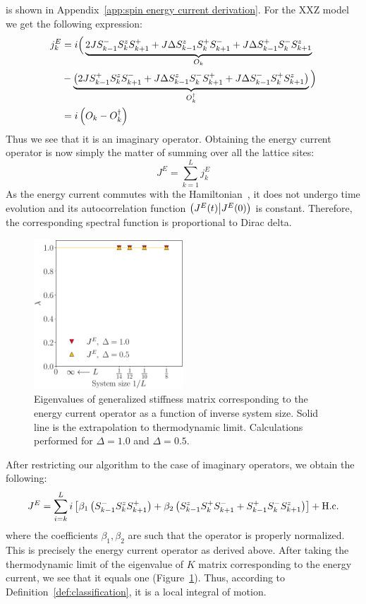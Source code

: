 is shown in Appendix~\ref{app:spin energy current derivation}. For the XXZ model we get the following expression:
\begin{align*}
  j_k^E & = i \Big( \underbrace{2J S^{-}_{k-1}S^{z}_k S^{+}_{k+1} + J \Delta S^{z}_{k-1}S^{+}_k S^{-}_{k+1} + J\Delta S^{+}_{k-1}S^{-}_kS^{z}_{k+1}}_{O_k}                                  \\
        & - \underbrace{\left(2J S^{+}_{k-1}S^{z}_k S^{-}_{k+1} + J\Delta S^{z}_{k-1}S^{-}_k S^{+}_{k+1} + J\Delta S^{-}_{k-1}S^{+}_{k} S^{z}_{k+1} \right)}_{O_k^{\dagger}}\Big) \nonumber \\
        & = i\left(O_k - O_k^{\dagger}\right)
\end{align*}
Thus we see that it is an imaginary operator.
Obtaining the energy current operator is now simply the matter of summing over all the lattice sites:
\begin{equation}
  J^E = \sum_{k=1}^L j_k^E
  \label{eq:energy current}
\end{equation}
As the energy current commutes with the Hamiltonian~\autocite{Zotos1997}, it does not undergo time evolution
and its autocorrelation function \(\left(J^E(t) \middle| J^E(0)\right)\) is constant. Therefore, the corresponding
spectral function is proportional to Dirac delta.
\begin{figure}[htbp]
  \centering
  \includegraphics[width=0.5\textwidth]{Figures/current_int.pdf}
  \caption{Eigenvalues of generalized stiffness matrix corresponding to the energy current
  operator as a function of inverse system size. Solid line is the extrapolation to thermodynamic
  limit. Calculations performed for \(\Delta=1.0\) and \(\Delta=0.5\).}\label{fig: current integrable}
\end{figure}
After restricting our algorithm to the case of imaginary
operators, we obtain the following:
\begin{equation}
    J^E = \sum_{i=k}^L i\left[\beta_1 \left(S^{-}_{k-1}S^{z}_{k}S^{+}_{k+1}\right) + \beta_2 \left(S^{z}_{k-1}S^{+}_{k}S^{-}_{k+1}+S^{+}_{k-1}S^{-}_{k}S^{z}_{k+1}\right)\right] + \text{H.c.}
\end{equation}
where the coefficients \(\beta_1,\beta_2\) are such that the operator is properly
normalized. This is precisely the energy current operator as derived above.
After taking the thermodynamic limit of the eigenvalue of \(K\) matrix 
corresponding to the energy current, we see that it equals one (Figure~\ref{fig: current integrable}).
Thus, according to Definition~\ref{def:classification}, it is a local integral of motion. 

